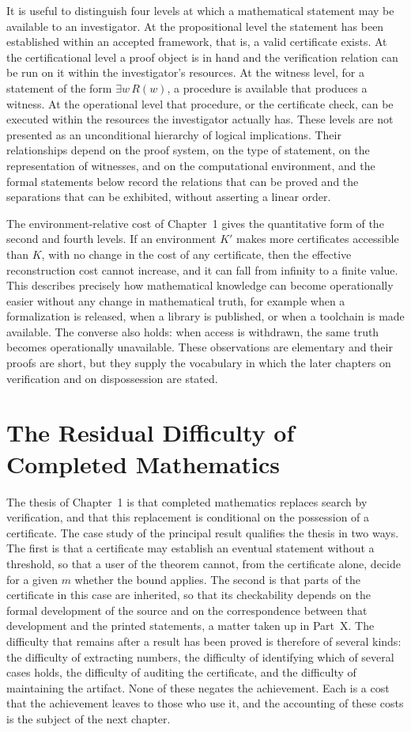 \documentclass[11pt,letterpaper]{report}
\theoremstyle{plain}
\theoremstyle{definition}
\theoremstyle{remark}
\begin{document}
It is useful to distinguish four levels at which a mathematical statement may be available to an investigator. At the propositional level the statement has been established within an accepted framework, that is, a valid certificate exists. At the certificational level a proof object is in hand and the verification relation can be run on it within the investigator's resources. At the witness level, for a statement of the form $\exists w\,R(w)$, a procedure is available that produces a witness. At the operational level that procedure, or the certificate check, can be executed within the resources the investigator actually has. These levels are not presented as an unconditional hierarchy of logical implications. Their relationships depend on the proof system, on the type of statement, on the representation of witnesses, and on the computational environment, and the formal statements below record the relations that can be proved and the separations that can be exhibited, without asserting a linear order.

The environment-relative cost of Chapter~1 gives the quantitative form of the second and fourth levels. If an environment $K'$ makes more certificates accessible than $K$, with no change in the cost of any certificate, then the effective reconstruction cost cannot increase, and it can fall from infinity to a finite value. This describes precisely how mathematical knowledge can become operationally easier without any change in mathematical truth, for example when a formalization is released, when a library is published, or when a toolchain is made available. The converse also holds: when access is withdrawn, the same truth becomes operationally unavailable. These observations are elementary and their proofs are short, but they supply the vocabulary in which the later chapters on verification and on dispossession are stated.

\section{The Residual Difficulty of Completed Mathematics}

The thesis of Chapter~1 is that completed mathematics replaces search by verification, and that this replacement is conditional on the possession of a certificate. The case study of the principal result qualifies the thesis in two ways. The first is that a certificate may establish an eventual statement without a threshold, so that a user of the theorem cannot, from the certificate alone, decide for a given $m$ whether the bound applies. The second is that parts of the certificate in this case are inherited, so that its checkability depends on the formal development of the source and on the correspondence between that development and the printed statements, a matter taken up in Part~X. The difficulty that remains after a result has been proved is therefore of several kinds: the difficulty of extracting numbers, the difficulty of identifying which of several cases holds, the difficulty of auditing the certificate, and the difficulty of maintaining the artifact. None of these negates the achievement. Each is a cost that the achievement leaves to those who use it, and the accounting of these costs is the subject of the next chapter.
\end{document}
